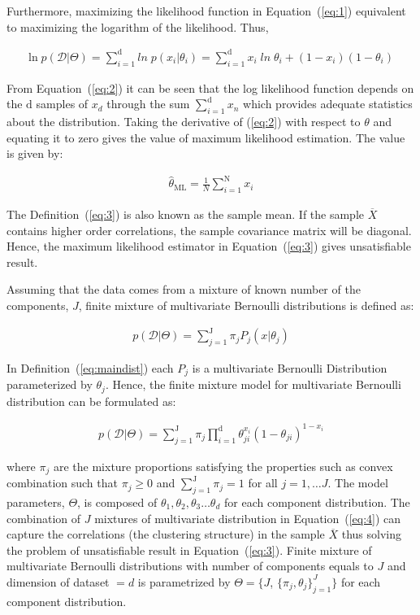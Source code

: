 Furthermore, maximizing the likelihood function in Equation~(\ref{eq:1}) equivalent to maximizing the logarithm of the likelihood. Thus,

\begin{eqnarray}
\label{eq:2}
\mathrm{ln} \; p(\mathcal{D}|\Theta)=\displaystyle\sum_{i=1}^{\mathrm{d}} ln \; p(x_i|\theta_i) = \displaystyle \sum _{i=1} ^{\mathrm{d}} x_i \; ln \; \theta_i +(1-{x_i})(1-\theta_i)
\end{eqnarray} 

From Equation~(\ref{eq:2}) it can be seen that the log likelihood function depends on the $\mathrm{d}$ samples of $x_d$ through the sum $\displaystyle\sum_{i=1}^{\mathrm{d}} x_n$ which provides adequate statistics about the distribution. Taking the derivative of (\ref{eq:2}) with respect to $\theta$ and equating it to zero gives the value of maximum likelihood estimation. The value is given by:

\begin{eqnarray}
\label{eq:3}
\hat{\theta}_{\mathrm{ML}} = \frac{1}{N} \displaystyle\sum_{i=1}^{\mathrm{N}}x_i
\end{eqnarray} 

The Definition~(\ref{eq:3}) is also known as the sample mean. If the sample $\overline{{X}}$ contains higher order correlations, the sample covariance matrix will be diagonal. Hence, the maximum likelihood estimator in Equation~(\ref{eq:3}) gives unsatisfiable result. 

Assuming that the data comes from a mixture of known number of the components, $J$, finite mixture of multivariate Bernoulli distributions is defined as:

\begin{eqnarray}
\label{eq:maindist}
 p(\mathcal{D}|\Theta)=\displaystyle\sum_{j=1}^{\mathrm{J}} \pi_j P_j(x|\theta_j)
\end{eqnarray}

In Definition~(\ref{eq:maindist}) each $P_j$ is a multivariate Bernoulli Distribution parameterized by $\theta_j$. Hence, the finite mixture model for multivariate Bernoulli distribution can be formulated as:

\begin{eqnarray}
\label{eq:4}
 p(\mathcal{D}|\Theta)=\displaystyle\sum_{j=1}^{\mathrm{J}} \pi_j \displaystyle \prod _{i=1} ^{\mathrm{d}} \theta_{ji}^{x_i} (1-\theta_{ji})^{1-x_i}
\end{eqnarray} 

where $\pi_j$ are the mixture proportions satisfying the properties such as convex combination such that $\pi_j \geq 0 $ and $\displaystyle\sum_{j=1}^{\mathrm{J}} \pi_j = 1$ for all $j=1, \ldots J$. The model parameters, $\Theta$, is composed of $\theta_1, \theta_2, \theta_3 \ldots \theta_d$ for each component distribution. The combination of $J$ mixtures of multivariate distribution in Equation~(\ref{eq:4}) can capture the correlations (the clustering structure) in the sample $\overline{{X}}$ thus solving the problem of unsatisfiable result in Equation~(\ref{eq:3}). Finite mixture of multivariate Bernoulli distributions with  number of components equals to $J$ and dimension of dataset $=d$ is parametrized by $\Theta=\{J$, $\{ \pi_j, \theta_j\}_{j=1}^{J}\}$ for each component distribution.

